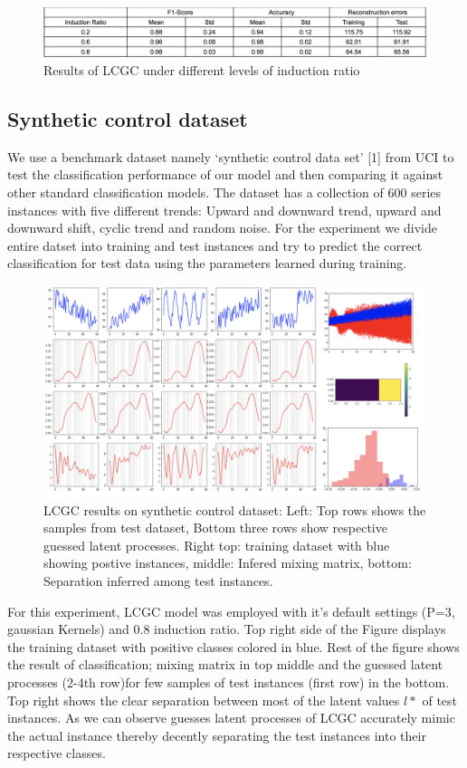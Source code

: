 \begin{figure}
    \centering
    \includegraphics[scale=0.35]{thesis/images/LCGC_inducing_results.png}
    \caption{Results of LCGC under different levels of induction ratio}
    \label{fig:lcpc_results_induction}
\end{figure}
\subsection{Synthetic control dataset}
We use a benchmark dataset namely ‘synthetic control data set’ [1] from UCI to test the classification performance of our  model and then comparing it against other standard classification models. The dataset has a collection of 600 series instances with five different trends: Upward and downward trend, upward and downward shift, cyclic trend and random noise. For the experiment we divide entire datset into training and test instances and try  to predict the correct classification for test data using the parameters learned during training. 
\begin{figure}
    \centering
    \includegraphics[scale=0.35]{thesis/images/LCGC_real_classification.png}
    \caption{LCGC results on synthetic control dataset: Left: Top rows shows the samples from test dataset, Bottom three rows show respective guessed latent processes. Right top: training dataset with blue showing postive instances, middle: Infered mixing matrix, bottom: Separation inferred among test instances.}
    \label{fig:lcgc_classifications}
\end{figure}
For this experiment, LCGC model was employed with it's default settings (P=3, gaussian Kernels) and 0.8 induction ratio. Top right side of the Figure displays the training dataset with positive classes colored in blue. Rest of the figure shows the result of classification;  mixing matrix in top middle and the guessed latent processes (2-4th row)for few samples of test instances (first row) in the bottom. Top right shows the clear separation between most of the latent values $l*$ of test instances. As we can observe guesses latent processes of LCGC accurately mimic the actual instance thereby decently separating the test instances into their respective classes. 

